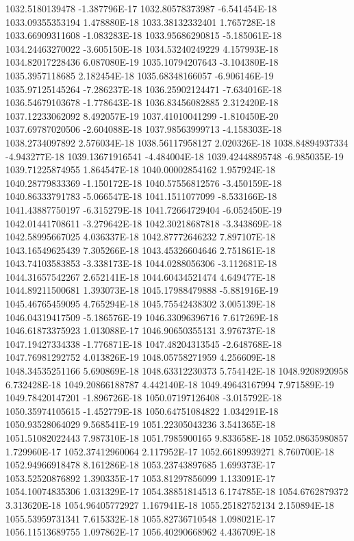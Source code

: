 1032.5180139478  -1.387796E-17
1032.80578373987  -6.541454E-18
1033.09355353194  1.478880E-18
1033.38132332401  1.765728E-18
1033.66909311608  -1.083283E-18
1033.95686290815  -5.185061E-18
1034.24463270022  -3.605150E-18
1034.53240249229  4.157993E-18
1034.82017228436  6.087080E-19
1035.10794207643  -3.104380E-18
1035.3957118685  2.182454E-18
1035.68348166057  -6.906146E-19
1035.97125145264  -7.286237E-18
1036.25902124471  -7.634016E-18
1036.54679103678  -1.778643E-18
1036.83456082885  2.312420E-18
1037.12233062092  8.492057E-19
1037.41010041299  -1.810450E-20
1037.69787020506  -2.604088E-18
1037.98563999713  -4.158303E-18
1038.2734097892  2.576034E-18
1038.56117958127  2.020326E-18
1038.84894937334  -4.943277E-18
1039.13671916541  -4.484004E-18
1039.42448895748  -6.985035E-19
1039.71225874955  1.864547E-18
1040.00002854162  1.957924E-18
1040.28779833369  -1.150172E-18
1040.57556812576  -3.450159E-18
1040.86333791783  -5.066547E-18
1041.1511077099  -8.533166E-18
1041.43887750197  -6.315279E-18
1041.72664729404  -6.052450E-19
1042.01441708611  -3.279642E-18
1042.30218687818  -3.343869E-18
1042.58995667025  4.036337E-18
1042.87772646232  7.897107E-18
1043.16549625439  7.305266E-18
1043.45326604646  2.751861E-18
1043.74103583853  -3.338173E-18
1044.0288056306  -3.112681E-18
1044.31657542267  2.652141E-18
1044.60434521474  4.649477E-18
1044.89211500681  1.393073E-18
1045.17988479888  -5.881916E-19
1045.46765459095  4.765294E-18
1045.75542438302  3.005139E-18
1046.04319417509  -5.186576E-19
1046.33096396716  7.617269E-18
1046.61873375923  1.013088E-17
1046.90650355131  3.976737E-18
1047.19427334338  -1.776871E-18
1047.48204313545  -2.648768E-18
1047.76981292752  4.013826E-19
1048.05758271959  4.256609E-18
1048.34535251166  5.690869E-18
1048.63312230373  5.754142E-18
1048.9208920958  6.732428E-18
1049.20866188787  4.442140E-18
1049.49643167994  7.971589E-19
1049.78420147201  -1.896726E-18
1050.07197126408  -3.015792E-18
1050.35974105615  -1.452779E-18
1050.64751084822  1.034291E-18
1050.93528064029  9.568541E-19
1051.22305043236  3.541365E-18
1051.51082022443  7.987310E-18
1051.7985900165  9.833658E-18
1052.08635980857  1.729960E-17
1052.37412960064  2.117952E-17
1052.66189939271  8.760700E-18
1052.94966918478  8.161286E-18
1053.23743897685  1.699373E-17
1053.52520876892  1.390335E-17
1053.81297856099  1.133091E-17
1054.10074835306  1.031329E-17
1054.38851814513  6.174785E-18
1054.6762879372  3.313620E-18
1054.96405772927  1.167941E-18
1055.25182752134  2.150894E-18
1055.53959731341  7.615332E-18
1055.82736710548  1.098021E-17
1056.11513689755  1.097862E-17
1056.40290668962  4.436709E-18
